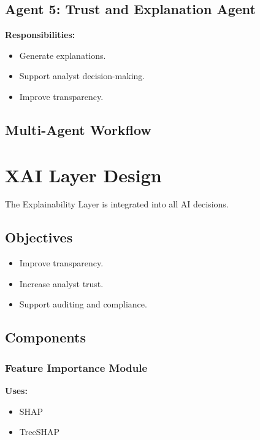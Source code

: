 \documentclass[12pt,a4paper]{report}
\begin{document}
\subsection{Agent 5: Trust and Explanation Agent}

\textbf{Responsibilities:}
\begin{itemize}
    \item Generate explanations.
    \item Support analyst decision-making.
    \item Improve transparency.
\end{itemize}

\subsection{Multi-Agent Workflow}

\section{XAI Layer Design}
\label{sec:xai_layer}

The Explainability Layer is integrated into all AI decisions.

\subsection{Objectives}
\begin{itemize}
    \item Improve transparency.
    \item Increase analyst trust.
    \item Support auditing and compliance.
\end{itemize}

\subsection{Components}

\subsubsection{Feature Importance Module}
\textbf{Uses:}
\begin{itemize}
    \item SHAP
    \item TreeSHAP
\end{itemize}
\end{document}
